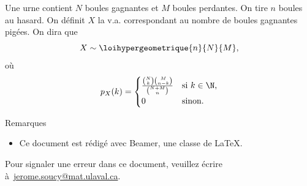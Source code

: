 \documentclass[nuit,charter,pied]{BeamerJS}
\begin{document}
\begin{frame}
\begin{defn}
Une urne contient $N$ boules gagnantes et $M$ boules perdantes. On tire $n$ boules au hasard. On définit $X$ la v.a. correspondant au nombre de boules gagnantes pigées. On dira que \[X\sim \loihypergeometrique{n}{N}{M},\]
où
\[
p_X(k)=\begin{cases}
\frac{\binom{N}{k}\binom{M}{n-k}}{\binom{N+M}{n}}&\text{si $k\in\N$,}\\
0&\text{sinon.}
\end{cases}\]
\end{defn}
\end{frame}
\begin{frame}{Remarques}

 \begin{rems}
 	\begin{itemize}
 		\item Ce document est rédigé avec Beamer, une classe de \LaTeX.
 	\end{itemize}
 \end{rems}

 	\vfill
 	\footnotesize Pour signaler une erreur dans ce document, veuillez écrire à~\href{mailto:jerome.soucy@mat.ulaval.ca}{jerome.soucy@mat.ulaval.ca}.
 \end{frame}
\end{document}
